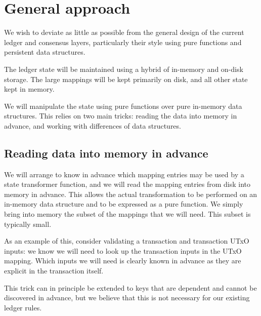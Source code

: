\documentclass[11pt,a4paper]{article}
\begin{document}
\section{General approach}


We wish to deviate as little as possible from the general design of the current
ledger and consensus layers, particularly their style using pure functions and
persistent data structures.

The ledger state will be maintained using a hybrid of in-memory and on-disk
storage. The large mappings will be kept primarily on disk, and all other state
kept in memory.

We will manipulate the state using pure functions over pure in-memory data
structures. This relies on two main tricks: reading the data into memory in
advance, and working with differences of data structures.

\subsection{Reading data into memory in advance}

We will arrange to know in advance which mapping entries may be used by
a state transformer function, and we will read the mapping entries from
disk into memory in advance. This allows the actual transformation to be
performed on an in-memory data structure and to be expressed as a pure
function. We simply bring into memory the subset of the mappings that we
will need. This subset is typically small.

As an example of this, consider validating a transaction and transaction
UTxO inputs: we know we will need to look up the transaction inputs in
the UTxO mapping. Which inputs we will need is clearly known in advance
as they are explicit in the transaction itself.

This trick can in principle be extended to keys that are dependent and
cannot be discovered in advance, but we believe that this is not
necessary for our existing ledger rules.
\end{document}

